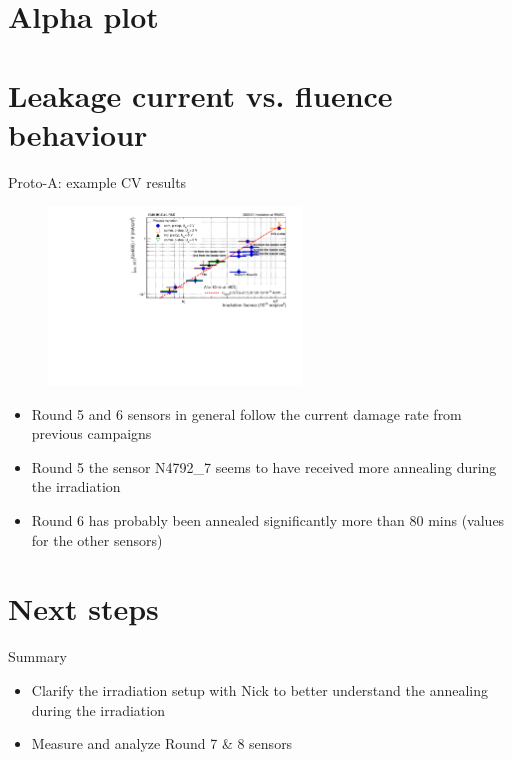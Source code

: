 \documentclass{beamer}
\begin{document}
\section{Alpha plot}
\section{Leakage current vs. fluence behaviour}
\begin{frame}{Proto-A: example CV results}
  \begin{figure}
      \includegraphics[width=0.6\textwidth]{plots/alpha_600V.pdf}    
  \end{figure}
  \begin{itemize}
    \item Round 5 and 6 sensors in general follow the current damage rate from previous campaigns
    \item Round 5 the sensor N4792\_7 seems to have received more annealing during the irradiation
    \item Round 6 has probably been annealed significantly more than 80 mins (values for the other sensors)
  \end{itemize}
\end{frame}


\section{Next steps}
\begin{frame}{Summary}
  \begin{itemize}
    \item Clarify the irradiation setup with Nick to better understand the annealing during the irradiation
    \item Measure and analyze Round 7 \& 8 sensors
  \end{itemize}
\end{frame}
\end{document}
